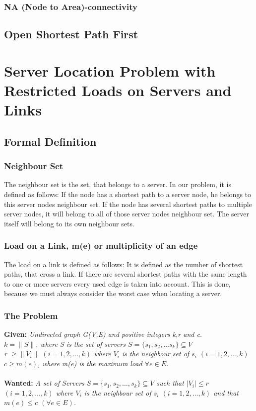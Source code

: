 \documentclass [12pt]{article}
\begin{document}
    
    \subsubsection {NA (Node to Area)-connectivity}
    \subsection{Open Shortest Path First}
\section{Server Location Problem with Restricted Loads on Servers and Links}
\subsection{Formal Definition}
\subsubsection{Neighbour Set}
    The neighbour set is the set, that belongs to a server. In our problem, it is
    defined as follows: If the node has a shortest path to a server node, he 
    belongs to this server nodes neighbour set. If the node has several shortest
    paths to multiple server nodes, it will belong to all of those server nodes neighbour
    set. The server itself will belong to its own neighbour sets.
    \subsubsection{Load on a Link, m(e) or multiplicity of an edge}
    The load on a link is defined as follows: 
    It is defined as the number of shortest paths, that cross a link. If there
    are several shortest paths with the same length to one or more servers every
    used edge is taken into account. This is done, because we must always consider
    the worst case when locating a server.
    \subsubsection{The Problem}
\textbf{Given:}
{\itshape Undirected graph G(V,E) and  positive integers k,r and c. \\
$k = \|S\|$, where S is the set of servers $S = \{s_1,s_2,\dots s_k\} \subseteq V$\\
r $\geq  \|V_i\|$ $(i=1,2,\dots,k)$ where $V_i$ is the neighbour set of $s_i$ $(i=1,2,\dots,k)$\\
$c \geq m(e)$, where m(e) is the maximum load $\forall e \in E$.} \\
\\
\textbf{Wanted:} 
{\itshape A set of Servers $S = \{s_1, s_2,\dots, s_k \} \subseteq V$ such that $|V_i|\leq r$
    $(i = 1,2, \dots,k)$ where $V_i$ is the neighbour set of $s_i$  $(i = 1,2,\dots,k)$ and that
$m(e) \leq c$ $(\forall e \in E)$.}
\end{document}
